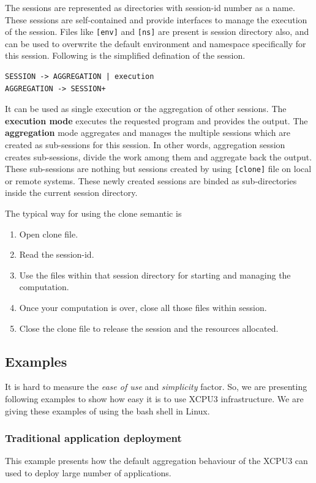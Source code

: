 \documentclass[conference]{IEEEtran}
\begin{document}
The sessions are represented as directories with session-id number as a name. 
These sessions are self-contained and provide interfaces to manage the
execution of the session.  Files like \texttt{[env]} and \texttt{[ns]} are
present is session directory also, and can be used to overwrite the default
environment and namespace specifically for this session.  Following is the
simplified defination of the session.
\begin{verbatim}
SESSION -> AGGREGATION | execution
AGGREGATION -> SESSION+
\end{verbatim}
It can be used as single execution or the aggregation of other sessions.
The \textbf{execution mode} executes the requested program and provides the
output.  The \textbf{aggregation} mode aggregates and manages the multiple
sessions which are created as sub-sessions for this session.  In other words,
aggregation session creates sub-sessions, divide the work among them and
aggregate back the output.  These sub-sessions are nothing but sessions created
by using \texttt{[clone]} file on local or remote systems.  These newly created
sessions are binded as sub-directories inside the current session directory.


The typical way for using the clone semantic is 
\begin{enumerate}
\item Open clone file.
\item Read the session-id. 
\item Use the files within that session directory for starting and managing the
computation.
\item Once your computation is over, close all those files within session.
\item Close the clone file to release the session and the resources allocated. 
\end{enumerate}


\subsection{Examples}
It is hard to measure the \textit{ease of use} and \textit{simplicity}
factor.  So, we are presenting following examples to show how easy it is
to use XCPU3 infrastructure.  We are giving these examples of using the bash
shell in Linux.

\subsubsection{Traditional application deployment}
This example presents how the default aggregation behaviour of the XCPU3 can
used to deploy large number of applications.
\end{document}
